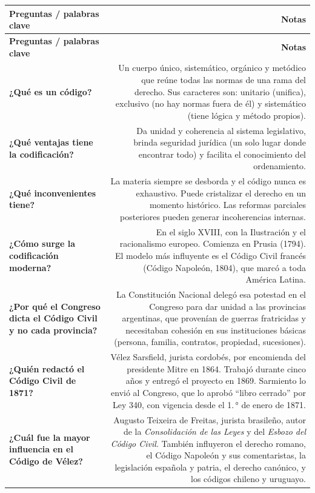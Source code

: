 \documentclass[12pt,oneside]{book}
\begin{document}
\begin{longtable}{Q|N}
\toprule
\textbf{Preguntas / palabras clave} & \textbf{Notas} \\
\midrule
\endfirsthead
\toprule
\textbf{Preguntas / palabras clave} & \textbf{Notas} \\
\midrule
\endhead

\textbf{¿Qué es un código?} &
Un cuerpo único, sistemático, orgánico y metódico que reúne todas las normas de una rama del derecho. Sus caracteres son: unitario (unifica), exclusivo (no hay normas fuera de él) y sistemático (tiene lógica y método propios). \\
\midrule

\textbf{¿Qué ventajas tiene la codificación?} &
Da unidad y coherencia al sistema legislativo, brinda seguridad jurídica (un solo lugar donde encontrar todo) y facilita el conocimiento del ordenamiento. \\
\midrule

\textbf{¿Qué inconvenientes tiene?} &
La materia siempre se desborda y el código nunca es exhaustivo. Puede cristalizar el derecho en un momento histórico. Las reformas parciales posteriores pueden generar incoherencias internas. \\
\midrule

\textbf{¿Cómo surge la codificación moderna?} &
En el siglo XVIII, con la Ilustración y el racionalismo europeo. Comienza en Prusia (1794). El modelo más influyente es el Código Civil francés (Código Napoleón, 1804), que marcó a toda América Latina. \\
\midrule

\textbf{¿Por qué el Congreso dicta el Código Civil y no cada provincia?} &
La Constitución Nacional delegó esa potestad en el Congreso para dar unidad a las provincias argentinas, que provenían de guerras fratricidas y necesitaban cohesión en sus instituciones básicas (persona, familia, contratos, propiedad, sucesiones). \\
\midrule

\textbf{¿Quién redactó el Código Civil de 1871?} &
Vélez Sarsfield, jurista cordobés, por encomienda del presidente Mitre en 1864. Trabajó durante cinco años y entregó el proyecto en 1869. Sarmiento lo envió al Congreso, que lo aprobó ``libro cerrado'' por Ley 340, con vigencia desde el 1.\,° de enero de 1871. \\
\midrule

\textbf{¿Cuál fue la mayor influencia en el Código de Vélez?} &
Augusto Teixeira de Freitas, jurista brasileño, autor de la \textit{Consolidación de las Leyes} y del \textit{Esbozo del Código Civil}. También influyeron el derecho romano, el Código Napoleón y sus comentaristas, la legislación española y patria, el derecho canónico, y los códigos chileno y uruguayo. \\
\midrule


\end{longtable}
\end{document}
